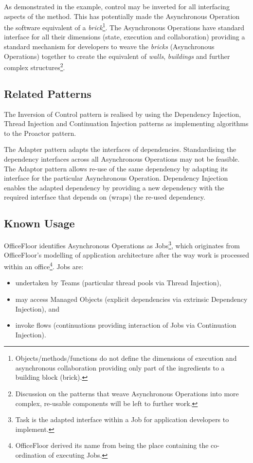 \documentclass[prodmode]{style/acmlarge}
\begin{document}
As demonstrated in the example, control may be inverted for all interfacing
aspects of the method.  This has potentially made the Asynchronous Operation the
software equivalent of a \textit{brick}\footnote{Objects/methods/functions do
not define the dimensions of execution and asynchronous collaboration providing
only part of the ingredients to a building block (brick).}.  The Asynchronous
Operations have standard interface for all their dimensions (state, execution
and collaboration) providing a standard mechanism for developers to weave the
\textit{bricks} (Asynchronous Operations) together to create the equivalent of
\textit{walls}, \textit{buildings} and further complex
structures\footnote{Discussion on the patterns that weave Asynchronous
Operations into more complex, re-usable components will be left to further
work.}.


\subsection{Related Patterns}

The Inversion of Control pattern is realised by using the Dependency Injection,
Thread Injection and Continuation Injection patterns as implementing algorithms
to the Proactor pattern.

The Adapter pattern \cite{gof} adapts the interfaces of dependencies.
Standardising the dependency interfaces across all Asynchronous Operations may
not be feasible.  The Adaptor pattern allows re-use of the same dependency by
adapting its interface for the particular Asynchronous Operation.  Dependency
Injection enables the adapted dependency by providing a new dependency with the
required interface that depends on (wraps) the re-used dependency.


\subsection{Known Usage}

OfficeFloor \cite{officefloor} identifies Asynchronous Operations as
Jobs\footnote{Task is the adapted interface within a Job for application
developers to implement.}, which originates from OfficeFloor's modelling of
application architecture after the way work is processed within an
office\footnote{OfficeFloor derived its name from being the place containing the
co-ordination of executing Jobs.}.  Jobs are:
\begin{itemize}
  \item undertaken by Teams (particular thread pools via Thread Injection),
  \item may access Managed Objects (explicit dependencies via extrinsic Dependency Injection), and
  \item invoke flows (continuations providing interaction of Jobs via Continuation Injection).
\end{itemize}
\end{document}
